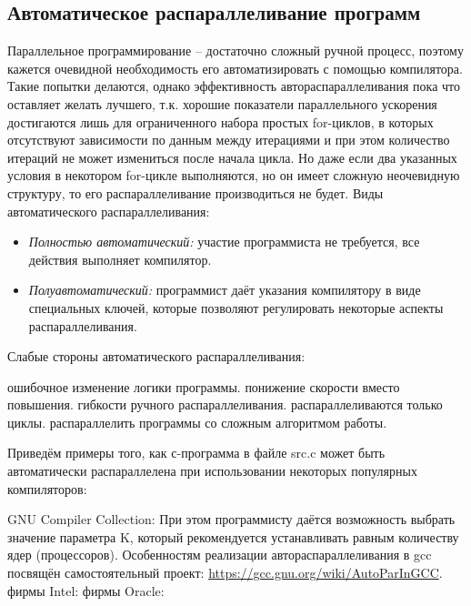 \subsection{Автоматическое распараллеливание программ}

Параллельное программирование – достаточно сложный ручной процесс, поэтому кажется очевидной необходимость его автоматизировать с помощью компилятора. Такие попытки делаются, однако эффективность автораспараллеливания пока что оставляет желать лучшего, т.к. хорошие показатели параллельного ускорения достигаются лишь для ограниченного набора простых for-циклов, в которых отсутствуют зависимости по данным между итерациями и при этом количество итераций не может измениться после начала цикла. Но даже если два указанных условия в некотором for-цикле выполняются, но он имеет сложную неочевидную структуру, то его распараллеливание производиться не будет. Виды автоматического распараллеливания:

\begin{itemize}
    \item\textit{Полностью автоматический:} участие программиста не требуется, все действия выполняет компилятор.
    \item\textit{Полуавтоматический:} программист даёт указания компилятору в виде специальных ключей, которые позволяют регулировать некоторые аспекты распараллеливания.
\end{itemize}


Слабые стороны автоматического распараллеливания:

\begin{itemize}
     ошибочное изменение логики программы.
     понижение скорости вместо повышения.
     гибкости ручного распараллеливания.
     распараллеливаются только циклы.
     распараллелить программы со сложным алгоритмом работы.
\end{itemize}

Приведём примеры того, как с-программа в файле src.c может быть автоматически распараллелена при использовании некоторых популярных компиляторов:

\begin{itemize}
     GNU Compiler Collection:	 
    При этом программисту даётся возможность выбрать значение параметра K, который рекомендуется устанавливать равным количеству ядер (процессоров). Особенностям реализации автораспараллеливания в gcc посвящён самостоятельный проект: \url{https://gcc.gnu.org/wiki/AutoParInGCC}. 
     фирмы Intel:  
     фирмы Oracle: 
\end{itemize}
